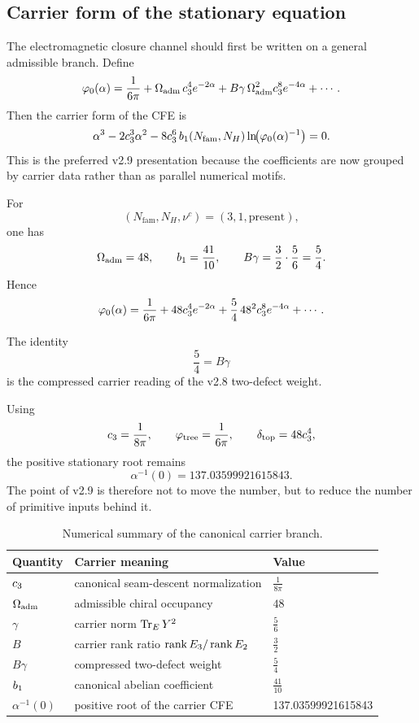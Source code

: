 \subsection{Carrier form of the stationary equation}

The electromagnetic closure channel should first be written on a general admissible branch. Define
\[
\varphi_0(\alpha)
= \frac{1}{6\pi}
+ \Omega_{\mathrm{adm}}\,c_3^4 e^{-2\alpha}
+ B\gamma\,\Omega_{\mathrm{adm}}^2c_3^8 e^{-4\alpha}
+ \cdots.
\]
Then the carrier form of the CFE is
\[
\alpha^3
-2c_3^3\alpha^2
-8c_3^6\,b_1(N_{\mathrm{fam}},N_H)
\ln\!\bigl(\varphi_0(\alpha)^{-1}\bigr)
=0.
\]
This is the preferred v2.9 presentation because the coefficients are now grouped by carrier data rather than as parallel numerical motifs.

\begin{proposition}
For
\[
(N_{\mathrm{fam}},N_H,\nu^c)=(3,1,\text{present}),
\]
one has
\[
\Omega_{\mathrm{adm}}=48,
\qquad
b_1=\frac{41}{10},
\qquad
B\gamma=\frac32\cdot\frac56=\frac54.
\]
Hence
\[
\varphi_0(\alpha)
= \frac{1}{6\pi}
+ 48c_3^4 e^{-2\alpha}
+ \frac54\,48^2c_3^8 e^{-4\alpha}
+ \cdots.
\]
\end{proposition}

\begin{remark}
The identity
\[
\frac54 = B\gamma
\]
is the compressed carrier reading of the v2.8 two-defect weight.
\end{remark}

Using
\[
c_3=\frac{1}{8\pi},
\qquad
\varphi_{\mathrm{tree}}=\frac{1}{6\pi},
\qquad
\delta_{\mathrm{top}}=48c_3^4,
\]
the positive stationary root remains
\[
\alpha^{-1}(0)=\num{137.03599921615843}.
\]
The point of v2.9 is therefore not to move the number, but to reduce the number of primitive inputs behind it.

\begin{table}[H]
\centering
\small
\begin{tabularx}{\linewidth}{@{}lXl@{}}
\toprule
Quantity & Carrier meaning & Value \\
\midrule
$c_3$ & canonical seam-descent normalization & $\frac{1}{8\pi}$ \\
$\Omega_{\mathrm{adm}}$ & admissible chiral occupancy & $48$ \\
$\gamma$ & carrier norm $\operatorname{Tr}_EY^2$ & $\frac56$ \\
$B$ & carrier rank ratio $\operatorname{rank} E_3/\operatorname{rank} E_2$ & $\frac32$ \\
$B\gamma$ & compressed two-defect weight & $\frac54$ \\
$b_1$ & canonical abelian coefficient & $\frac{41}{10}$ \\
$\alpha^{-1}(0)$ & positive root of the carrier CFE & \num{137.03599921615843} \\
\bottomrule
\end{tabularx}
\caption{Numerical summary of the canonical carrier branch.}
\end{table}


